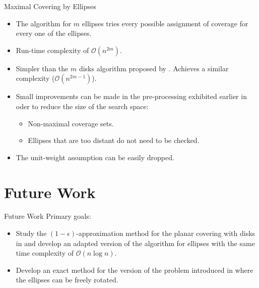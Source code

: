 \documentclass{beamer}
\newcommand{\bigO}{\mathscr{O}}
\begin{document}
\begin{frame}{Maximal Covering by Ellipses}
	
	\begin{itemize}
		\item The algorithm for $m$ ellipses tries every possible assignment of coverage for every one of the ellipses.
		\item Run-time complexity of $\bigO(n^{2m})$.
		
		\item Simpler than the $m$ disks algorithm proposed by \autocite{cabello:2006}. Achieves a similar complexity ($\bigO(n^{2m-1})$).
		
		\item Small improvements can be made in the pre-processing exhibited earlier in oder to reduce the size of the search space:
		\begin{itemize}
			\item Non-maximal coverage sets.
			\item Ellipses that are too distant do not need to be checked.
		\end{itemize}
	
		\item The unit-weight assumption can be easily dropped.
	\end{itemize}
	
\end{frame}




\section{Future Work}

\begin{frame}{Future Work}
	Primary goals:
\begin{itemize}
	\item Study the $(1-\epsilon)$-approximation method for the planar covering with disks in \autocite{cabello:2006} and develop an adapted version of the algorithm for ellipses with the same time complexity of $\bigO(n\log{n})$.
	
	\item Develop an exact method for the version of the problem introduced in \autocite{andreta} where the ellipses can be freely rotated.
\end{itemize}
\end{frame}
\end{document}
